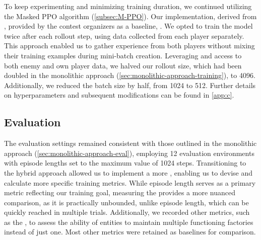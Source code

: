 \noindent To keep experimenting and minimizing training duration, we continued utilizing the Masked PPO algorithm (\autoref{subsec:M-PPO}). Our implementation, derived from \cite{luxai_s2-baseline-source}, provided by the contest organizers as a baseline, . We opted to train the model twice after each rollout step, using data collected from each player separately. This approach enabled us to gather experience from both players without mixing their training examples during mini-batch creation. Leveraging  and access to both enemy and own player data, we halved our rollout size, which had been doubled in the monolithic approach (\autoref{sec:monolithic-approach-training}), to 4096. Additionally, we reduced the batch size by half, from 1024 to 512. Further details on hyperparameters and subsequent modifications can be found in \autoref{app:c}.

\subsection{Evaluation} \label{sec:hybrid-metrics}

\noindent The evaluation settings remained consistent with those outlined in the monolithic approach (\autoref{sec:monolithic-approach-eval}), employing 12 evaluation environments with episode lengths set to the maximum value of 1024 steps. Transitioning to the hybrid approach allowed us to implement a more , enabling us to devise and calculate more specific training metrics. While episode length serves as a primary metric reflecting our training goal, measuring the  provides a more nuanced comparison, as it is practically unbounded, unlike episode length, which can be quickly reached in multiple trials. Additionally, we recorded other metrics, such as the , to assess the ability of entities to maintain multiple functioning factories instead of just one. Most other metrics were retained as baselines for comparison.
